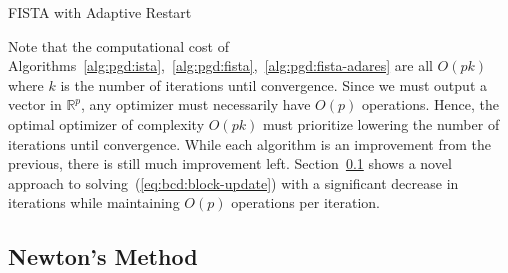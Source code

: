 \documentclass[fontsize=11pt]{article}
\newcommand{\R}{\mathbb{R}}
\begin{document}
\begin{algorithm}
    \caption{FISTA with Adaptive Restart}\label{alg:pgd:fista-adares}
\end{algorithm}

Note that the computational cost of 
Algorithms~\ref{alg:pgd:ista},~\ref{alg:pgd:fista},~\ref{alg:pgd:fista-adares}
are all $O(p k)$ where $k$ is the number of iterations until convergence.
Since we must output a vector in $\R^p$, 
any optimizer must necessarily have $O(p)$ operations.
Hence, the optimal optimizer of complexity $O(pk)$ must prioritize lowering 
the number of iterations until convergence.
While each algorithm is an improvement from the previous,
there is still much improvement left.
Section~\ref{ssec:newton} shows a novel approach to solving~(\ref{eq:bcd:block-update})
with a significant decrease in iterations while maintaining $O(p)$ operations per iteration.


\subsection{Newton's Method}\label{ssec:newton}
\end{document}
